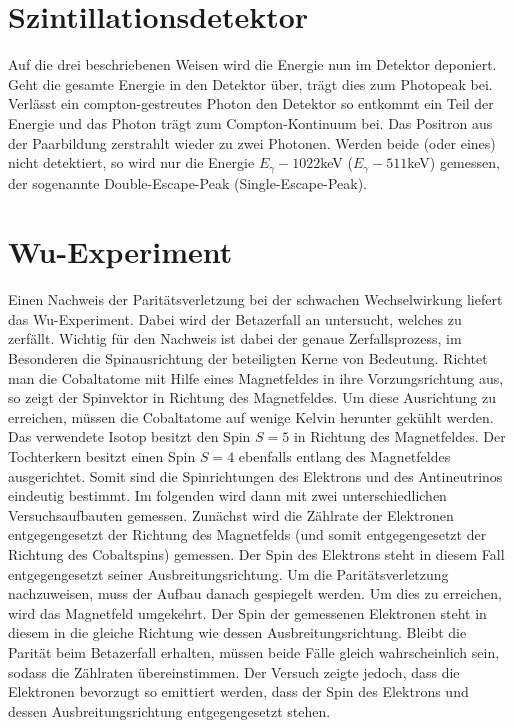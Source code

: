 \documentclass[twoside,colorback,accentcolor=tud4c,11pt]{tudreport}
\begin{document}
\section{Szintillationsdetektor}
Auf die drei beschriebenen Weisen wird die Energie nun im Detektor deponiert. Geht die gesamte Energie in den Detektor über, trägt dies zum Photopeak bei. Verlässt ein compton-gestreutes Photon den Detektor so entkommt ein Teil der Energie und das Photon trägt zum Compton-Kontinuum bei. Das Positron aus der Paarbildung zerstrahlt wieder zu zwei Photonen. Werden beide (oder eines) nicht detektiert, so wird nur die Energie $ E_\gamma-1022 $keV ($ E_\gamma-511 $keV) gemessen, der sogenannte Double-Escape-Peak (Single-Escape-Peak).
\section{Wu-Experiment}
Einen Nachweis der Paritätsverletzung bei der schwachen Wechselwirkung liefert das Wu-Experiment. Dabei wird der Betazerfall an  untersucht, welches zu  zerfällt. Wichtig für den Nachweis ist dabei der genaue Zerfallsprozess, im Besonderen die Spinausrichtung der beteiligten Kerne von Bedeutung. Richtet man die Cobaltatome mit Hilfe eines Magnetfeldes in ihre Vorzungsrichtung aus, so zeigt der Spinvektor in Richtung des Magnetfeldes. Um diese Ausrichtung zu erreichen, müssen die Cobaltatome auf wenige Kelvin herunter gekühlt werden. Das verwendete Isotop besitzt den Spin $S=5$ in Richtung des Magnetfeldes. Der Tochterkern besitzt einen Spin $S=4$ ebenfalls entlang des Magnetfeldes ausgerichtet. Somit sind die Spinrichtungen des Elektrons und des Antineutrinos eindeutig bestimmt. Im folgenden wird dann mit zwei unterschiedlichen Versuchsaufbauten gemessen. Zunächst 
wird die Zählrate der Elektronen entgegengesetzt der Richtung des Magnetfelds (und somit entgegengesetzt der Richtung des Cobaltspins) gemessen. Der Spin des Elektrons steht in diesem Fall entgegengesetzt seiner Ausbreitungsrichtung. Um die Paritätsverletzung nachzuweisen, muss der Aufbau danach gespiegelt werden. Um dies zu erreichen, wird das Magnetfeld umgekehrt. Der Spin der gemessenen Elektronen steht in diesem in die gleiche Richtung wie dessen Ausbreitungsrichtung. Bleibt die Parität beim Betazerfall erhalten, müssen beide Fälle gleich wahrscheinlich sein, sodass die Zählraten übereinstimmen. Der Versuch zeigte jedoch, dass die Elektronen bevorzugt so emittiert werden, dass der Spin des Elektrons und dessen Ausbreitungsrichtung entgegengesetzt stehen.
\newpage
\end{document}
